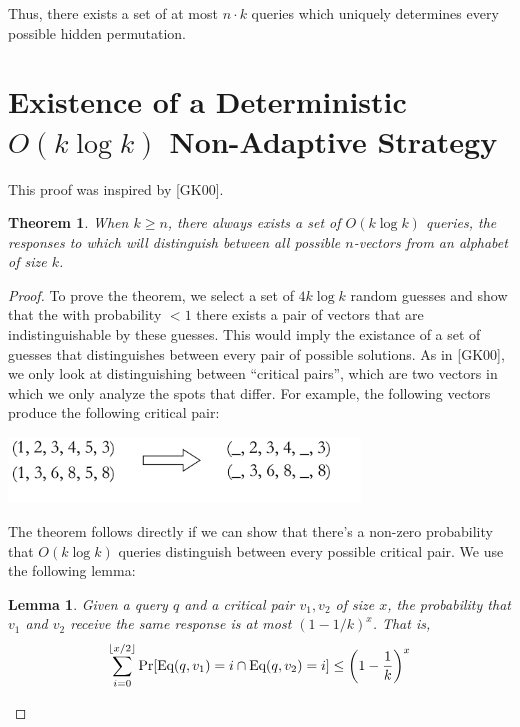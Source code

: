 \documentclass[12pt, a4paper]{article}
\newtheorem{theorem}{Theorem}
\newtheorem{lemma}{Lemma}
\begin{document}
Thus, there exists a set of at most $n\cdot k$ queries which uniquely determines every
possible hidden permutation.

\clearpage
\section*{Existence of a Deterministic $O(k\log k)$ Non-Adaptive Strategy}
This proof was inspired by [GK00].
	\begin{theorem}
    When $k\ge n$, there always exists a set of $O(k\log k)$ queries,
    the responses to which will distinguish between all possible $n$-vectors from an
    alphabet of size $k$.
	\end{theorem}

	\begin{proof}
	To prove the theorem, we select a set of $4k\log k$ random guesses and show that the with probability $<1$
	there exists a pair of vectors that are indistinguishable by these guesses. This would imply
	the existance of a set of guesses that distinguishes between every pair of possible solutions.
	As in [GK00], we only look at distinguishing between ``critical pairs'', which are
	two vectors in which we only analyze the spots that differ. For example, the
	following vectors produce the following critical pair:\\
		\begin{center}
		\includegraphics[width=0.7\textwidth, keepaspectratio=true]{criticalpair.pdf}
		\end{center}
	The theorem follows directly if we can show that there's a non-zero probability
	that $O(k\log k)$ queries distinguish between every possible critical pair. We
	use the following lemma:
    	\begin{lemma}
    	Given a query $q$ and a critical pair $v_1,v_2$ of size $x$,
		the probability that $v_1$ and $v_2$ receive the same response is at most
		$(1-1/k)^x$. That is,
    	\begin{equation*}
    	\sum_{i=0}^{\left\lfloor x/2 \right\rfloor}
		\textnormal{Pr}[\textnormal{Eq}(q,v_1) = i
    	\cap\textnormal{Eq}(q,v_2) = i] \leq \left(1-\frac{1}{k}\right)^x
    	\end{equation*}
    	\end{lemma}		
		

\end{proof}
\end{document}
